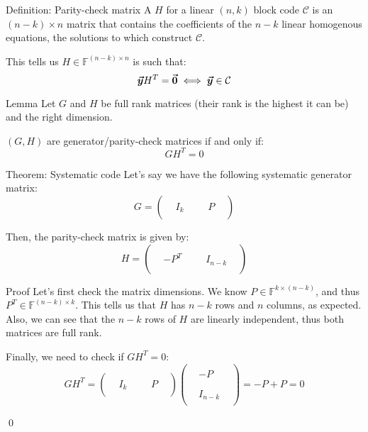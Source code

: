 \documentclass[a4paper]{article}
\begin{document}
\begin{parag}{Definition: Parity-check matrix}
    A  $H$ for a linear $\left(n, k\right)$ block code $\mathcal{C}$ is an $\left(n-k\right)\times n$ matrix that contains the coefficients of the $n-k$ linear homogenous equations, the solutions to which construct $\mathcal{C}$.

    This tells us $H \in \mathbb{F}^{\left(n-k\right) \times n}$ is such that:
    \[\bm{\protect\vec{y}} H^T = \bm{\protect\vec{0}} \iff \bm{\protect\vec{y}} \in \mathcal{C}\]
\end{parag}

\begin{parag}{Lemma}
    Let $G$ and $H$ be full rank matrices (their rank is the highest it can be) and the right dimension.

    $\left(G, H\right)$ are generator/parity-check matrices if and only if: 
    \[GH^T = 0\]
\end{parag}


\begin{parag}{Theorem: Systematic code}
    Let's say we have the following systematic generator matrix: 
    \[G = \begin{pmatrix}  &  &  &  &  &  \\  & I_k &  &  & P &  \\  &  &  &  &  &  \end{pmatrix} \]
    
    Then, the parity-check matrix is given by: 
    \[H = \begin{pmatrix}  &  &  &  &  &  \\  & -P^T &  &  & I_{n-k} &  \\  &  &  &  &  &  \end{pmatrix} \]
    
    \begin{subparag}{Proof}
        Let's first check the matrix dimensions. We know $P \in \mathbb{F}^{k \times \left(n-k\right)}$, and thus $P^T \in \mathbb{F}^{\left(n-k\right) \times k}$. This tells us that $H$ has $n-k$ rows and $n$ columns, as expected. Also, we can see that the $n-k$ rows of $H$ are linearly independent, thus both matrices are full rank.

        Finally, we need to check if $G H^T = 0$: 
        \[G H^T = \begin{pmatrix}  &  &  &  &  &  \\  & I_k &  &  & P &  \\  &  &  &  &  &  \end{pmatrix} \begin{pmatrix}  &  &  \\  & -P &  \\  &  &  \\  &  &  \\  & I_{n-k} &  \\  &  &  \end{pmatrix} = -P + P = 0\]

        \qed
    \end{subparag}
    
\end{parag}
\end{document}
